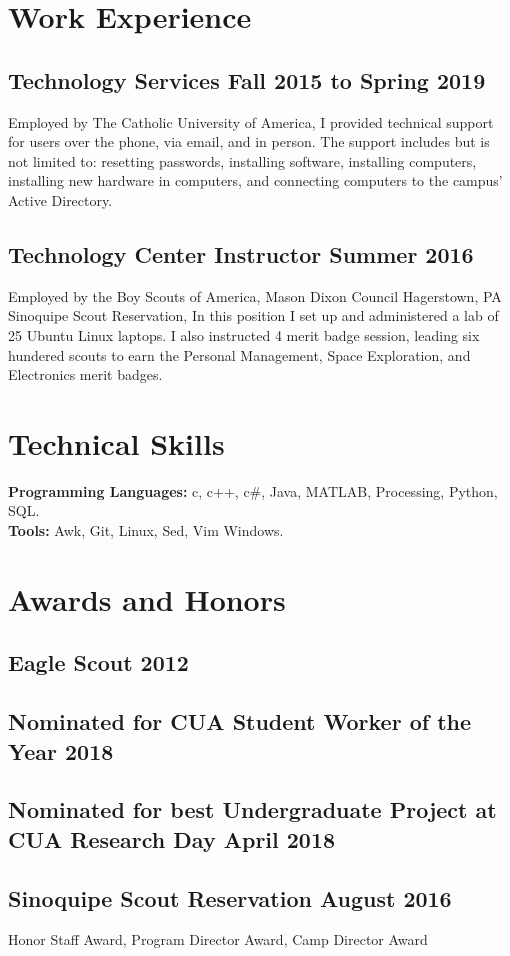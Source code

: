 \documentclass{article}
\begin{document}
\section{Work Experience}
\subsection{Technology Services \hfill Fall 2015 to Spring 2019}
Employed by The Catholic University of America,
I provided technical support for users over the phone, via email, and in person.
The support includes but is not limited to:
resetting passwords,
installing software,
installing computers,
installing new hardware in computers,
and
connecting computers to the campus' Active Directory.

\subsection{Technology Center Instructor \hfill Summer 2016}
Employed by the Boy Scouts of America, Mason Dixon Council Hagerstown, PA Sinoquipe Scout Reservation,
In this position I set up and administered a lab of 25 Ubuntu Linux laptops.
I also instructed 4 merit badge session, leading six hundered scouts to earn the
Personal Management,
Space Exploration,
and
Electronics
merit badges.

\section{Technical Skills}
\textbf{Programming Languages:}
c,
c++,
c\#,
Java,
MATLAB,
Processing,
Python,
SQL.\\
\textbf{Tools:}
Awk,
Git,
Linux,
Sed,
Vim
Windows.

\section{Awards and Honors}
\subsection{Eagle Scout \hfill 2012}
\subsection{Nominated for CUA Student Worker of the Year \hfill 2018}
\subsection{Nominated for best Undergraduate Project at CUA Research Day \hfill April 2018}
\subsection{Sinoquipe Scout Reservation \hfill August 2016}
Honor Staff Award, Program Director Award, Camp Director Award
\end{document}
